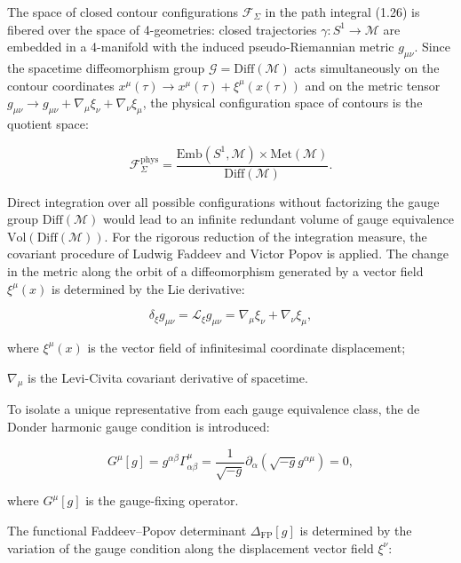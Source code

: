 \documentclass[11pt,a4paper]{article}
\theoremstyle{definition}
\begin{document}
The space of closed contour configurations $\mathcal{F}_\Sigma$ in the path integral (1.26) is fibered over the space of 4-geometries: closed trajectories $\gamma: S^1 \to \mathcal{M}$ are embedded in a 4-manifold with the induced pseudo-Riemannian metric $g_{\mu\nu}$. Since the spacetime diffeomorphism group $\mathcal{G} = \text{Diff}(\mathcal{M})$ acts simultaneously on the contour coordinates $x^\mu(\tau) \to x^\mu(\tau) + \xi^\mu(x(\tau))$ and on the metric tensor $g_{\mu\nu} \to g_{\mu\nu} + \nabla_\mu \xi_\nu + \nabla_\nu \xi_\mu$, the physical configuration space of contours is the quotient space:

\begin{equation}\label{eq:1.42}\tag{1.42}
\mathcal{F}_\Sigma^{\text{phys}} = \frac{\text{Emb}(S^1, \mathcal{M}) \times \text{Met}(\mathcal{M})}{\text{Diff}(\mathcal{M})}.
\end{equation}

Direct integration over all possible configurations without factorizing the gauge group $\text{Diff}(\mathcal{M})$ would lead to an infinite redundant volume of gauge equivalence $\text{Vol}(\text{Diff}(\mathcal{M}))$. For the rigorous reduction of the integration measure, the covariant procedure of Ludwig Faddeev and Victor Popov \cite{ref7} is applied. The change in the metric along the orbit of a diffeomorphism generated by a vector field $\xi^\mu(x)$ is determined by the Lie derivative:

\begin{equation}\label{eq:1.43}\tag{1.43}
\delta_\xi g_{\mu\nu} = \mathcal{L}_\xi g_{\mu\nu} = \nabla_\mu \xi_\nu + \nabla_\nu \xi_\mu,
\end{equation}

where $\xi^\mu(x)$ is the vector field of infinitesimal coordinate displacement;  

$\nabla_\mu$ is the Levi-Civita covariant derivative of spacetime.

To isolate a unique representative from each gauge equivalence class, the de Donder harmonic gauge condition is introduced:

\begin{equation}\label{eq:1.44}\tag{1.44}
G^\mu[g] = g^{\alpha\beta} \Gamma^\mu_{\alpha\beta} = \frac{1}{\sqrt{-g}} \partial_\alpha \left( \sqrt{-g} g^{\alpha\mu} \right) = 0,
\end{equation}

where $G^\mu[g]$ is the gauge-fixing operator.

The functional Faddeev--Popov determinant $\Delta_{\text{FP}}[g]$ is determined by the variation of the gauge condition along the displacement vector field $\xi^\nu$:
\end{document}
